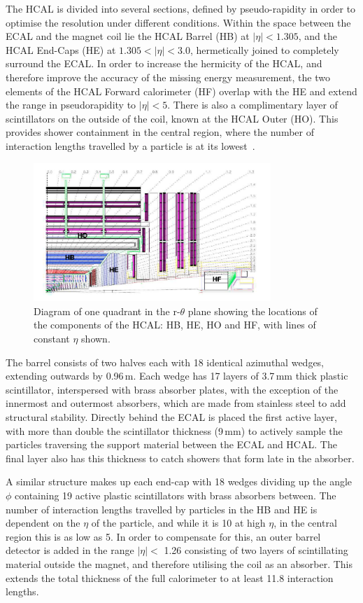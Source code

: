  The HCAL is divided into several sections, defined by pseudo-rapidity in order to optimise the resolution under different conditions. Within the space between the ECAL and the magnet coil lie the HCAL Barrel (HB) at $|\eta| < 1.305$, and the HCAL End-Caps (HE) at $1.305 < |\eta| < 3.0$, hermetically joined to completely surround the ECAL. In order to increase the hermicity of the HCAL, and therefore improve the accuracy of the missing energy measurement, the two elements of the HCAL Forward calorimeter (HF) overlap with the HE and extend the range in pseudorapidity to $|\eta|<5$. There is also a complimentary layer of scintillators on the outside of the coil, known at the HCAL Outer (HO).  This provides shower containment in the central region, where the number of interaction lengths travelled by a particle is at its lowest~\cite{HCALTDR}.


\begin{figure}
\centering
\includegraphics[width=0.8\textwidth]{Figures/Detector/HCAL}
\caption{Diagram of one quadrant in the r-$\theta$ plane showing the locations of the components of the HCAL: HB, HE, HO and HF, with lines of constant $\eta$ shown.}
\label{fig:HCAL}
\end{figure}


The barrel consists of two halves each with 18 identical azimuthal wedges, extending outwards by 0.96\,m. Each wedge has 17 layers of 3.7\,mm thick plastic scintillator, interspersed with brass absorber plates, with the exception of the innermost and outermost absorbers, which are made from stainless steel to add structural stability. Directly behind the ECAL is placed the first active layer, with more than double the scintillator thickness (9\,mm) to actively sample the particles traversing the support material between the ECAL and HCAL. The final layer also has this thickness to catch showers that form late in the absorber. 

A similar structure makes up each end-cap with 18 wedges dividing up the angle $\phi$ containing 19 active plastic scintillators with brass absorbers between. The number of interaction lengths travelled by particles in the HB and HE is dependent on the $\eta$ of the particle, and while it is 10 at high $\eta$, in the central region this is as low as 5. In order to compensate for this, an outer barrel detector is added in the range $|\eta| <$ 1.26 consisting of two layers of scintillating material outside the magnet, and therefore utilising the coil as an absorber. This extends the total thickness of the full calorimeter to at least 11.8 interaction lengths. 

